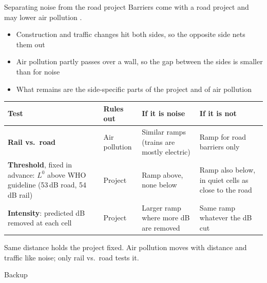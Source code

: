 \documentclass[aspectratio=169, 10pt]{beamer}
\newcommand{\muted}[1]{{\color{black!55}#1}}
\begin{document}
\begin{frame}{Separating noise from the road project}
\small
Barriers come with a road project and may lower air pollution \parencite{baldaufImpactsNoiseBarriers2008,greenhillNoisePollutionInfant2026}.
\begin{itemize}\setlength{\itemsep}{0pt}
  \item Construction and traffic changes hit both sides, so the opposite side nets them out
  \item Air pollution partly passes over a wall, so the gap between the sides is smaller than for noise
  \item What remains are the side-specific parts of the project and of air pollution
\end{itemize}

\renewcommand{\arraystretch}{1.1}
\footnotesize
\begin{tabular}{@{}L{0.27\textwidth}L{0.12\textwidth}L{0.25\textwidth}L{0.26\textwidth}@{}}
\toprule
\textbf{Test} & \textbf{Rules out} & \textbf{If it is noise} & \textbf{If it is not} \\
\midrule
\textbf{Rail vs.\ road} & Air pollution & Similar ramps (trains are mostly electric) & Ramp for road barriers only \\
\textbf{Threshold}, fixed in advance: $L^0$ above WHO guideline (53\,dB road, 54\,dB rail) & Project & Ramp above, none below & Ramp also below, in quiet cells as close to the road \\
\textbf{Intensity}: predicted dB removed at each cell & Project & Larger ramp where more dB are removed & Same ramp whatever the dB cut \\
\bottomrule
\end{tabular}

\smallskip
\muted{Same distance holds the project fixed. Air pollution moves with distance and traffic like noise; only rail vs.\ road tests it.}
\end{frame}

\appendix
\begin{frame}[standout]
  Backup
\end{frame}
\end{document}
